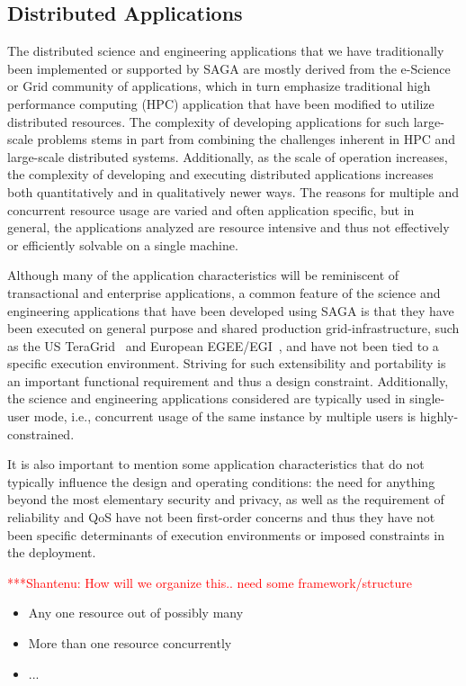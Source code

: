 \documentclass[a4paper,10pt]{article}
\newcommand{\jhanote}[1]{  {\textcolor{red}     { ***Shantenu: #1 }}}
\newcommand{\jhanote}[1]{}
\begin{document}
\subsection{Distributed Applications}

 The distributed science and engineering applications that we have
 traditionally been implemented or supported by SAGA are mostly
 derived from the e-Science or Grid community of applications, which
 in turn emphasize traditional high performance computing (HPC)
 application that have been modified to utilize distributed resources.
 The complexity of developing applications for such large-scale
 problems stems in part from combining the challenges inherent in HPC
 and large-scale distributed systems.  Additionally, as the scale of
 operation increases, the complexity of developing and executing
 distributed applications increases both quantitatively and in
 qualitatively newer ways.  The reasons for multiple and concurrent
 resource usage are varied and often application specific, but in
 general, the applications analyzed are resource intensive and thus
 not effectively or efficiently solvable on a single machine.

 Although many of the application characteristics will be reminiscent
 of transactional and enterprise applications, a common feature of the
 science and engineering applications that have been developed using
 SAGA is that they have been executed on general purpose and shared
 production grid-infrastructure, such as the US
 TeraGrid~\cite{teragrid} and European EGEE/EGI~\cite{egi}, and have
 not been tied to a specific execution environment. Striving for such
 extensibility and portability is an important functional requirement
 and thus a design constraint. Additionally, the science and
 engineering applications considered are typically used in single-user
 mode, i.e., concurrent usage of the same instance by multiple users
 is highly-constrained.

 It is also important to mention some application characteristics that
 do not typically influence the design and operating conditions: the
 need for anything beyond the most elementary security and privacy, as
 well as the requirement of reliability and QoS have not been
 first-order concerns and thus they have not been specific
 determinants of execution environments or imposed constraints in the
 deployment.

\jhanote{How will we organize this.. need some framework/structure}

\begin{itemize}
\item Any one resource out of possibly many
\item More than one resource concurrently
\item ...
\end{itemize}
\end{document}
